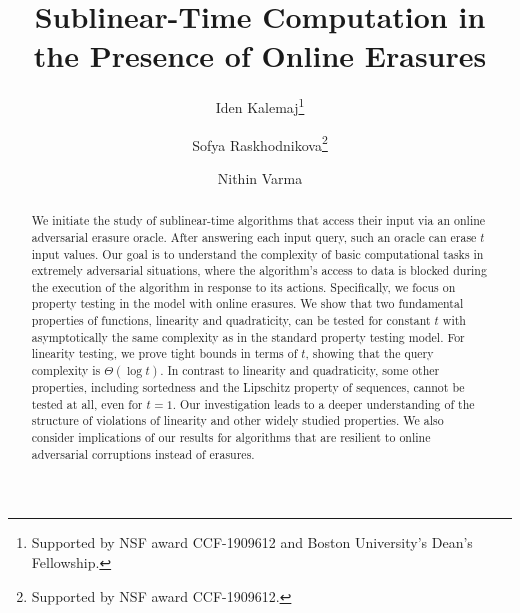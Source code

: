 \documentclass{toc}
\begin{document}
\begin{frontmatter}%

%
%
%

%
%

%
%

  \title{Sublinear-Time Computation in the Presence of Online Erasures}
%
%
%

%
%
%
%
%
%
%
%
%
%
%
%


%
%
%
%

%

\author[kalemaj]{Iden Kalemaj\thanks{Supported by NSF award CCF-1909612 and Boston University's Dean's Fellowship.}}
\author[raskhodnikova]{Sofya Raskhodnikova\thanks{Supported by NSF award CCF-1909612.}}
\author[varma]{Nithin Varma}

%
%
%
%

%
%
%
%
%
%
%
%
\begin{abstract}
  We initiate the study of sublinear-time algorithms that access their input via an online adversarial erasure oracle. After answering each input query,
	   such an oracle can erase $t$ input values. Our goal is to understand the complexity of basic computational tasks in extremely adversarial situations, where the algorithm's access to data is blocked during the execution of the algorithm in response to its actions. Specifically, we focus on property testing in the model with online erasures. We show that two fundamental properties of functions, linearity and quadraticity, can be tested for constant $t$ with asymptotically the same complexity as in the standard property testing model. For linearity testing, we prove tight bounds  in terms of $t$, showing that the query complexity is $\Theta(\log t).$ In contrast to linearity and quadraticity, some other properties, including sortedness and the Lipschitz property of sequences, cannot be tested at all, even for $t=1$.  Our investigation leads to a deeper understanding of the structure of violations of linearity and other widely studied properties. We also consider implications of our results for algorithms that are resilient to online adversarial corruptions instead of erasures.
\end{abstract}

%

\end{frontmatter}
\end{document}
